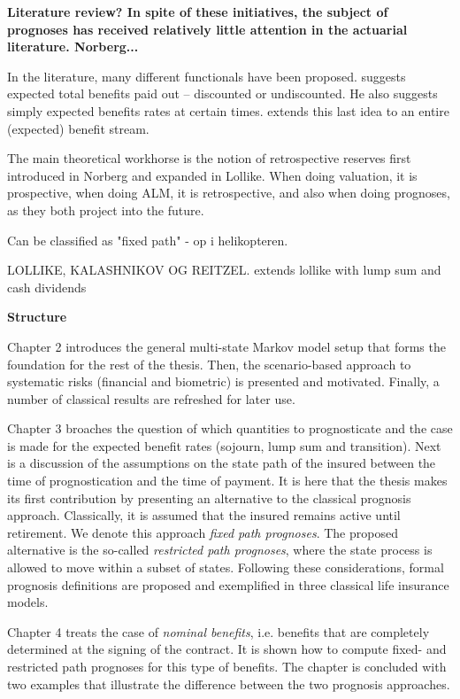 \documentclass{article}
\newcommand{\1}[1]{\mathbbm{1}_{\left\lbrace #1 \right\rbrace}}
\theoremstyle{break}
\theoremstyle{remark}
\numberwithin{equation}{section}
\begin{document}
\textbf{Literature review? In spite of these initiatives, the subject of prognoses has received relatively little attention in the actuarial literature. Norberg...}

In the literature, many different functionals have been proposed. \cite{Norberg2001} suggests expected total benefits paid out -- discounted or undiscounted. He also suggests simply expected benefits rates at certain times. \cite{NinnaReitzel} extends this last idea to an entire (expected) benefit stream.

The main theoretical workhorse is the notion of retrospective reserves first introduced in Norberg and expanded in Lollike. When doing valuation, it is prospective, when doing ALM, it is retrospective, and also when doing prognoses, as they both project into the future.

Can be classified as "fixed path" - op i helikopteren.

LOLLIKE, KALASHNIKOV OG REITZEL. extends lollike with lump sum and cash dividends

\textbf{Structure}

Chapter 2 introduces the general multi-state Markov model setup that forms the foundation for the rest of the thesis. Then, the scenario-based approach to systematic risks (financial and biometric) is presented and motivated. Finally, a number of classical results are refreshed for later use.

Chapter 3 broaches the question of which quantities to prognosticate and the case is made for the expected benefit rates (sojourn, lump sum and transition). Next is a discussion of the assumptions on the state path of the insured between the time of prognostication and the time of payment. It is here that the thesis makes its first contribution by presenting an alternative to the classical prognosis approach. Classically, it is assumed that the insured remains active until retirement. We denote this approach \textit{fixed path prognoses}. The proposed alternative is the so-called \textit{restricted path prognoses}, where the state process is allowed to move within a subset of states. Following these considerations, formal prognosis definitions are proposed and exemplified in three classical life insurance models.

Chapter 4 treats the case of \textit{nominal benefits}, i.e. benefits that are completely determined at the signing of the contract. It is shown how to compute fixed- and restricted path prognoses for this type of benefits. The chapter is concluded with two examples that illustrate the difference between the two prognosis approaches.
\end{document}

